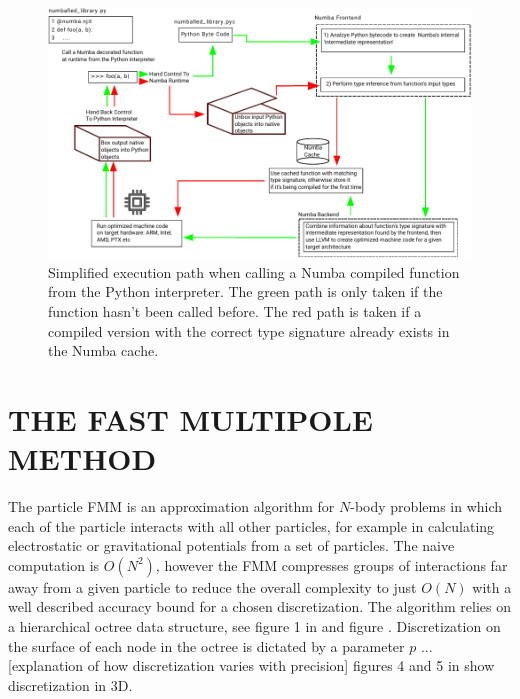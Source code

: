 \documentclass{IEEEcsmag}
\begin{document}
\begin{figure}
    \centerline{\includegraphics {figures/numba.pdf}}
    \caption{Simplified execution path when calling a Numba compiled function from the Python interpreter. The green path is only taken if the function hasn't been called before. The red path is taken if a compiled version with the correct type signature already exists in the Numba cache.}
    \label{fig:numba}
\end{figure}






\section{THE FAST MULTIPOLE METHOD}

The particle FMM is an approximation algorithm for $N$-body problems in which each of the particle interacts with all other particles, for example in calculating electrostatic or gravitational potentials from a set of particles. The naive computation is $O(N^2)$, however the FMM compresses groups of interactions far away from a given particle to reduce the overall complexity to just $O(N)$ with a well described accuracy bound for a chosen discretization. The algorithm relies on a hierarchical octree data structure, see figure 1 in \cite{Sundar2007} and figure . Discretization on the surface of each node in the octree is dictated by a parameter $p$ ... [explanation of how discretization varies with precision] figures 4 and 5 in \cite{Ying2004} show discretization in 3D.
\end{document}
